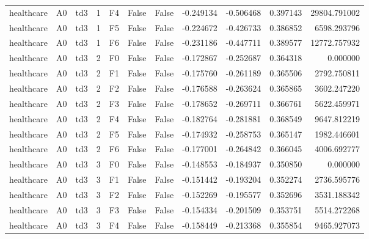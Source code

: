 \begin{tabular}{lllrlllrrrr}
healthcare &      A0 &       td3 &     1 &  F4 &           False &            False & -0.249134 & -0.506468 & 0.397143 &     29804.791002 \\
healthcare &      A0 &       td3 &     1 &  F5 &           False &            False & -0.224672 & -0.426733 & 0.386852 &      6598.293796 \\
healthcare &      A0 &       td3 &     1 &  F6 &           False &            False & -0.231186 & -0.447711 & 0.389577 &     12772.757932 \\
healthcare &      A0 &       td3 &     2 &  F0 &           False &            False & -0.172867 & -0.252687 & 0.364318 &         0.000000 \\
healthcare &      A0 &       td3 &     2 &  F1 &           False &            False & -0.175760 & -0.261189 & 0.365506 &      2792.750811 \\
healthcare &      A0 &       td3 &     2 &  F2 &           False &            False & -0.176588 & -0.263624 & 0.365865 &      3602.247220 \\
healthcare &      A0 &       td3 &     2 &  F3 &           False &            False & -0.178652 & -0.269711 & 0.366761 &      5622.459971 \\
healthcare &      A0 &       td3 &     2 &  F4 &           False &            False & -0.182764 & -0.281881 & 0.368549 &      9647.812219 \\
healthcare &      A0 &       td3 &     2 &  F5 &           False &            False & -0.174932 & -0.258753 & 0.365147 &      1982.446601 \\
healthcare &      A0 &       td3 &     2 &  F6 &           False &            False & -0.177001 & -0.264842 & 0.366045 &      4006.692777 \\
healthcare &      A0 &       td3 &     3 &  F0 &           False &            False & -0.148553 & -0.184937 & 0.350850 &         0.000000 \\
healthcare &      A0 &       td3 &     3 &  F1 &           False &            False & -0.151442 & -0.193204 & 0.352274 &      2736.595776 \\
healthcare &      A0 &       td3 &     3 &  F2 &           False &            False & -0.152269 & -0.195577 & 0.352696 &      3531.188342 \\
healthcare &      A0 &       td3 &     3 &  F3 &           False &            False & -0.154334 & -0.201509 & 0.353751 &      5514.272268 \\
healthcare &      A0 &       td3 &     3 &  F4 &           False &            False & -0.158449 & -0.213368 & 0.355854 &      9465.927073 \\

\end{tabular}
